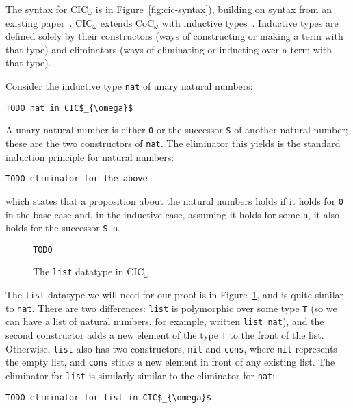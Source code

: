 The syntax for CIC$_{\omega}$ is in Figure~\ref{fig:cic-syntax}), building on syntax from an existing paper~\cite{Timany2015FirstST}.
CIC$_{\omega}$ extends CoC$_{\omega}$ with inductive types~\cite{inductive}.
Inductive types are defined solely by their constructors (ways of constructing or making a term with that type)
and eliminators (ways of eliminating or inducting over a term with that type).

Consider the inductive type \lstinline{nat} of unary natural numbers:

\begin{lstlisting}
TODO nat in CIC$_{\omega}$
\end{lstlisting}
A unary natural number is either \lstinline{0} or the successor \lstinline{S} of another natural number;
these are the two constructors of \lstinline{nat}.
The eliminator this yields is the standard induction principle for natural numbers:

\begin{lstlisting}
TODO eliminator for the above
\end{lstlisting}
which states that a proposition about the natural numbers holds if it holds for \lstinline{0} in the base case and, in the inductive case,
assuming it holds for some \lstinline{n}, it also holds for the successor \lstinline{S n}.

\begin{figure}
\begin{lstlisting}
TODO
\end{lstlisting}
\caption{The \lstinline{list} datatype in CIC$_{\omega}$}
\label{fig:list-theory}
\end{figure}

The \lstinline{list} datatype we will need for our proof is in Figure~\ref{fig:list-theory}, and is quite similar to \lstinline{nat}.
There are two differences: \lstinline{list} is polymorphic over some type \lstinline{T} (so we can have a list of natural numbers,
for example, written \lstinline{list nat}), and the second constructor adds a new element of the type \lstinline{T} to the front of the list.
Otherwise, \lstinline{list} also has two constructors, \lstinline{nil} and \lstinline{cons}, where \lstinline{nil} represents the empty list,
and \lstinline{cons} sticks a new element in front of any existing list.
The eliminator for \lstinline{list} is similarly similar to the eliminator for \lstinline{nat}:

\begin{lstlisting}
TODO eliminator for list in CIC$_{\omega}$
\end{lstlisting}

